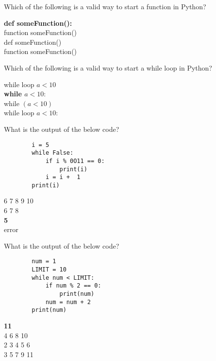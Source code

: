 \documentclass{exam}
\begin{document}
\begin{questions}
    \question Which of the following is a valid way to start a function in Python?

    \begin{oneparchoices}
        \choice \textbf{def someFunction():} \\
        \choice function someFunction() \\
        \choice def someFunction() \\
        \choice function someFunction()
    \end{oneparchoices}

    \question Which of the following is a valid way to start a while loop in Python?

    \begin{oneparchoices}
        \choice while loop $a < 10$ \\
        \choice \textbf{while $a < 10:$} \\
        \choice while $(a < 10)$ \\
        \choice while loop $a < 10:$ 
    \end{oneparchoices}

    \question What is the output of the below code?

    \begin{verbatim}
        i = 5
        while False:
            if i % 0O11 == 0:
                print(i)
            i = i +  1
        print(i)
    \end{verbatim}

    \begin{oneparchoices}
         6 7 8 9 10 \\ 
         6 7 8 \\
        \choice \textbf{5} \\ 
        \choice error
    \end{oneparchoices}

    \question What is the output of the below code?

    \begin{verbatim}
        num = 1
        LIMIT = 10
        while num < LIMIT:
            if num % 2 == 0:
                print(num)
            num = num + 2
        print(num)
    \end{verbatim}

    \begin{oneparchoices} 
        \choice \textbf{11} \\
         4 6 8 10 \\ 
         2 3 4 5 6 \\
         3 5 7 9 11 
    \end{oneparchoices}


\end{questions}
\end{document}
